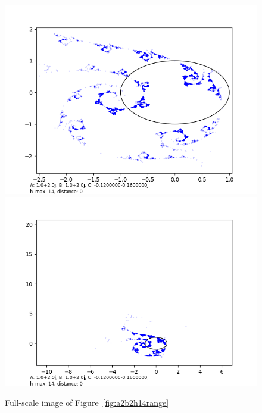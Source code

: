 \documentclass[12pt,a4paper,reqno,parskip=full]{amsart}
\numberwithin{equation}{section}
\theoremstyle{plain}
\theoremstyle{definition}
\begin{document}
\begin{figure}[H]
    \centering
    \includegraphics[width=\textwidth]{images/a2b2/a2,b2,h14,d0 custom bounds.png}
    \includegraphics[width=\textwidth]{images/a2b2/a2,b2,h14,d0.png}
    \caption{Full-scale image of Figure~\ref{fig:a2b2h14range}}
\end{figure}
\end{document}
